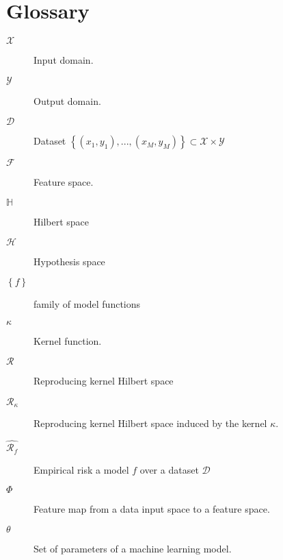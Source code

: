 
\chapter*{Glossary}


\begin{description} 
  \item[$\mathcal{X}$] Input domain.
  
  \item[$\mathcal{Y}$] Output domain.

  \item [$\mathcal{D}$] Dataset $\left\lbrace (x_1,y_1),...,(x_M,y_M)\right\rbrace \subset \mathcal{X}\times \mathcal{Y}$

  \item[$\mathcal{F}$] Feature space.

  \item[$\mathbb{H}$] Hilbert space

  \item [$\mathcal{H}$] Hypothesis space

  \item [$\left\lbrace f \right\rbrace$] family of model functions 
  
  \item[$\kappa$] Kernel function.

  \item[$\mathcal{R}$] Reproducing kernel Hilbert space

  \item[$\mathcal{R}_{\kappa}$] Reproducing kernel Hilbert space induced by the kernel $\kappa$.

  \item[$\hat{\mathcal{R}_f}$] Empirical risk a model $f$ over a dataset $\mathcal{D}$

  \item[$\Phi$] Feature map from a data input space to a feature space.

  \item[$\theta$] Set of parameters of a machine learning model.
\end{description}
\endinput
